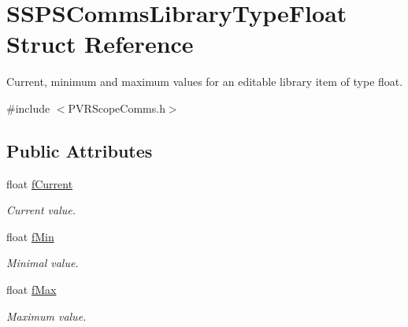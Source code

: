 \hypertarget{struct_s_s_p_s_comms_library_type_float}{\section{S\+S\+P\+S\+Comms\+Library\+Type\+Float Struct Reference}
\label{struct_s_s_p_s_comms_library_type_float}
}


Current, minimum and maximum values for an editable library item of type float.  




{\ttfamily \#include $<$P\+V\+R\+Scope\+Comms.\+h$>$}

\subsection*{Public Attributes}
\begin{DoxyCompactItemize}
\item 
\hypertarget{struct_s_s_p_s_comms_library_type_float_aa04626d125e20b328d65702d8ac8d55d}{float \hyperlink{struct_s_s_p_s_comms_library_type_float_aa04626d125e20b328d65702d8ac8d55d}{f\+Current}}\label{struct_s_s_p_s_comms_library_type_float_aa04626d125e20b328d65702d8ac8d55d}

\begin{DoxyCompactList}\small\item\em Current value. \end{DoxyCompactList}\item 
\hypertarget{struct_s_s_p_s_comms_library_type_float_aa2b3aa157aa55d0c28128467891a77c8}{float \hyperlink{struct_s_s_p_s_comms_library_type_float_aa2b3aa157aa55d0c28128467891a77c8}{f\+Min}}\label{struct_s_s_p_s_comms_library_type_float_aa2b3aa157aa55d0c28128467891a77c8}

\begin{DoxyCompactList}\small\item\em Minimal value. \end{DoxyCompactList}\item 
\hypertarget{struct_s_s_p_s_comms_library_type_float_ac7241340ee63ab2603b289b716b404df}{float \hyperlink{struct_s_s_p_s_comms_library_type_float_ac7241340ee63ab2603b289b716b404df}{f\+Max}}\label{struct_s_s_p_s_comms_library_type_float_ac7241340ee63ab2603b289b716b404df}

\begin{DoxyCompactList}\small\item\em Maximum value. \end{DoxyCompactList}\end{DoxyCompactItemize}



